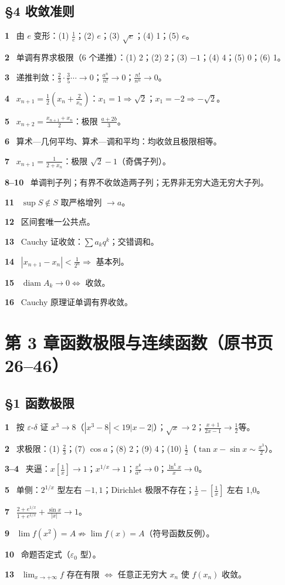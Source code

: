 \documentclass[11pt,a4paper,UTF8]{ctexart}
\newcommand{\eps}{\varepsilon}
\newcommand{\qitem}[1]{\par\smallskip\noindent\textbf{#1}\ }
\begin{document}
\subsection*{§4 收敛准则}
\qitem{1} 由 $e$ 变形：(1) $\frac1e$；(2) $e$；(3) $\sqrt e$；(4) 1；(5) $e$。\\
\qitem{2} 单调有界求极限（6 个递推）：(1) 2；(2) 2；(3) $-1$；(4) 4；(5) 0；(6) 1。\\
\qitem{3} 递推判敛：$\frac23\cdot\frac35\cdots\to0$；$\frac{a^n}{n!}\to0$；$\frac{n!}{n^n}\to0$。\\
\qitem{4} $x_{n+1}=\frac12(x_n+\frac2{x_n})$：$x_1=1\Rightarrow\sqrt2$；$x_1=-2\Rightarrow-\sqrt2$。\\
\qitem{5} $x_{n+2}=\frac{x_{n+1}+x_n}2$：极限 $\frac{a+2b}3$。\\
\qitem{6} 算术—几何平均、算术—调和平均：均收敛且极限相等。\\
\qitem{7} $x_{n+1}=\frac1{2+x_n}$：极限 $\sqrt2-1$（奇偶子列）。\\
\qitem{8--10} 单调判子列；有界不收敛造两子列；无界非无穷大造无穷大子列。\\
\qitem{11} $\sup S\notin S$ 取严格增列 $\to a$。\\
\qitem{12} 区间套唯一公共点。\\
\qitem{13} Cauchy 证收敛：$\sum a_kq^k$；交错调和。\\
\qitem{14} $|x_{n+1}-x_n|<\frac1{2^n}\Rightarrow$ 基本列。\\
\qitem{15} $\operatorname{diam}A_k\to0\iff$ 收敛。\\
\qitem{16} Cauchy 原理证单调有界收敛。

\section{第 3 章\quad 函数极限与连续函数（原书页 26--46）}
\subsection*{§1 函数极限}
\qitem{1} 按 $\eps$-$\delta$ 证 $x^3\to8$（$|x^3-8|<19|x-2|$）；$\sqrt x\to2$；$\frac{x+1}{2x-1}\to\frac12$等。\\
\qitem{2} 求极限：(1) $\frac23$；(7) $\cos a$；(8) 2；(9) 4；(10) $\frac12$（$\tan x-\sin x\sim\frac{x^3}2$）。\\
\qitem{3--4} 夹逼：$x[\frac1x]\to1$；$x^{1/x}\to1$；$\frac{x^k}{a^x}\to0$；$\frac{\ln^k x}{x}\to0$。\\
\qitem{5} 单侧：$2^{1/x}$ 型左右 $-1,1$；Dirichlet 极限不存在；$\frac1x-[\frac1x]$ 左右 1,0。\\
\qitem{7} $\frac{2+e^{1/x}}{1+e^{1/x}}+\frac{\sin x}{|x|}\to1$。\\
\qitem{9} $\lim f(x^2)=A\not\Rightarrow\lim f(x)=A$（符号函数反例）。\\
\qitem{10} 命题否定式（$\eps_0$ 型）。\\
\qitem{13} $\lim_{x\to+\infty}f$ 存在有限 $\iff$ 任意正无穷大 $x_n$ 使 $f(x_n)$ 收敛。
\end{document}
